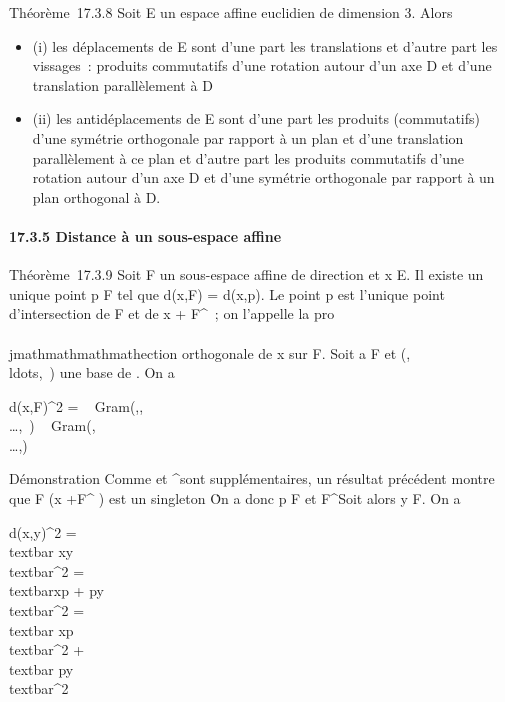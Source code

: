 Théorème~17.3.8 Soit E un espace affine euclidien de dimension 3. Alors

\begin{itemize}
\itemsep1pt\parskip0pt
\item
  (i) les déplacements de E sont d'une part les translations et d'autre
  part les vissages~: produits commutatifs d'une rotation autour d'un
  axe D et d'une translation parallèlement à D
\item
  (ii) les antidéplacements de E sont d'une part les produits
  (commutatifs) d'une symétrie orthogonale par rapport à un plan et
  d'une translation parallèlement à ce plan et d'autre part les produits
  commutatifs d'une rotation autour d'un axe D et d'une symétrie
  orthogonale par rapport à un plan orthogonal à D.
\end{itemize}

\paragraph{17.3.5 Distance à un sous-espace affine}

Théorème~17.3.9 Soit F un sous-espace affine de direction
\overrightarrowF et x \in E. Il existe un unique point
p \in F tel que d(x,F) = d(x,p). Le point p est l'unique point
d'intersection de F et de x +\overrightarrow
F^\bot~; on l'appelle la pro\\\\jmathmathmathmathection orthogonale de x sur F.
Soit a \in F et
(,\\ldots,\vecek~)
une base de \overrightarrowF. On a

d(x,F)^2 =
~
Gram(\overrightarrowax,,\\\ldots,\vecek~)
\over
{}~
Gram(,\\\ldots,\vecek)~

Démonstration Comme \overrightarrowF et
\overrightarrowF^\bot sont supplémentaires,
un résultat précédent montre que F \bigcap\left (x
+\overrightarrow F^\bot\right
) est un singleton \p\. On a donc p \in
F et \overrightarrowxp
\in\overrightarrow F^\bot Soit alors y \in F. On
a

d(x,y)^2
=\\textbar{}\overrightarrow
xy\\textbar{}^2
=\\textbar{}\overrightarrow xp
+\overrightarrow
py\\textbar{}^2
=\\textbar{}\overrightarrow
xp\\textbar{}^2
+\\textbar{}\overrightarrow
py\\textbar{}^2

